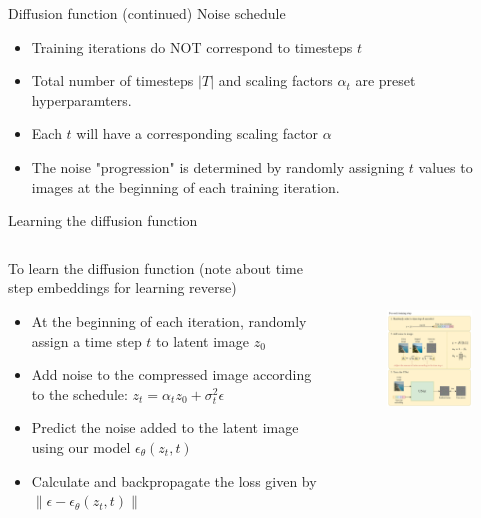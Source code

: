 \documentclass[8pt]{beamer}
\begin{document}
\begin{frame}{Diffusion function (continued)}
    Noise schedule
    \begin{itemize}
        \item Training iterations do NOT correspond to timesteps $t$
        \item Total number of timesteps $\lvert T \rvert$ and scaling factors $\alpha_t$ are preset hyperparamters.
        \item Each $t$ will have a corresponding scaling factor $\alpha$
        \item The noise "progression" is determined by randomly assigning $t$ values to images at the beginning of each training iteration.
    \end{itemize}
\end{frame}



\begin{frame}{Learning the diffusion function}
    \begin{columns}
        \begin{column}{0.5\textwidth}
            To learn the diffusion function
            (note about time step embeddings for learning reverse)
            \begin{itemize}
                \item At the beginning of each iteration, randomly assign a time step $t$ to latent image $z_0$
                \item Add noise to the compressed image according to the schedule: $z_t = \alpha_t z_0 + \sigma_t^2\epsilon$
                \item Predict the noise added to the latent image using our model $\epsilon_{\theta}(z_t, t)$
                \item Calculate and backpropagate the loss given by $\| \epsilon - \epsilon_{\theta}(z_t, t) \|$
            \end{itemize}
           \cite{steins}
        \end{column}
        \begin{column}{0.5\textwidth}
           \begin{figure}
               \centering
               \includegraphics[width=150pt, height=150pt]{images/add_noise_via_schedule.png}
               \label{fig:NN_training}
           \end{figure}
        \end{column}
   \end{columns}
\end{frame}
\end{document}
